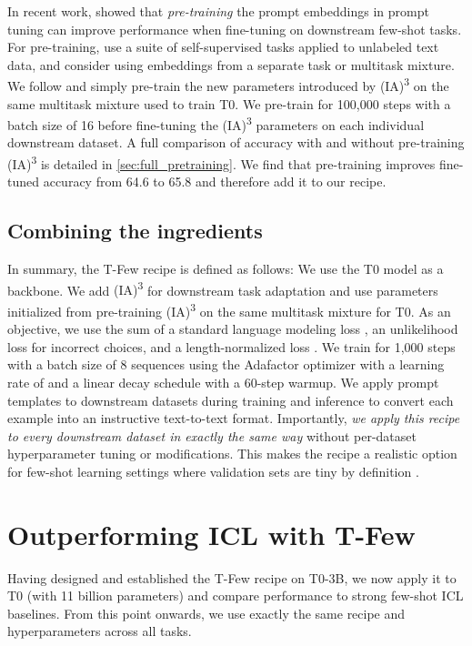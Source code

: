 \documentclass{article}
\newcommand{\ia}{{\fontfamily{lmtt}\selectfont (IA)\textsuperscript{3}}\xspace}
\newcommand{\tfew}{{\fontfamily{lmtt}\selectfont T-Few}\xspace}
\begin{document}
In recent work, \citet{gu2021ppt,vu2021spot} showed that \textit{pre-training} the prompt embeddings in prompt tuning can improve performance when fine-tuning on downstream few-shot tasks.
For pre-training, \citet{gu2021ppt} use a suite of self-supervised tasks applied to unlabeled text data, and \citet{vu2021spot} consider using embeddings from a separate task or multitask mixture.
We follow \citet{vu2021spot} and simply pre-train the new parameters introduced by \ia on the same multitask mixture used to train T0.
We pre-train for 100,000 steps with a batch size of 16 before fine-tuning the \ia parameters on each individual downstream dataset.
A full comparison of accuracy with and without pre-training \ia is detailed in \cref{sec:full_pretraining}.
We find that pre-training improves fine-tuned accuracy from 64.6 to 65.8 and therefore add it to our recipe.

\subsection{Combining the ingredients}

In summary, the \tfew recipe is defined as follows:
We use the T0 model as a backbone.
We add \ia for downstream task adaptation and use parameters initialized from pre-training \ia on the same multitask mixture for T0.
As an objective, we use the sum of a standard language modeling loss , an unlikelihood loss  for incorrect choices, and a length-normalized loss .
We train for 1,000 steps with a batch size of 8 sequences using the Adafactor optimizer \cite{shazeer2018adafactor} with a learning rate of  and a linear decay schedule with a 60-step warmup.
We apply prompt templates to downstream datasets during training and inference to convert each example into an instructive text-to-text format.
Importantly, \textit{we apply this recipe to every downstream dataset in exactly the same way} without per-dataset hyperparameter tuning or modifications.
This makes the recipe a realistic option for few-shot learning settings where validation sets are tiny by definition \cite{perez2021true,oliver2018realistic}.

\section{Outperforming ICL with \tfew}
\label{sec:experiments}

Having designed and established the \tfew recipe on T0-3B, we now apply it to T0 (with 11 billion parameters) and compare performance to strong few-shot ICL baselines.
From this point onwards, we use exactly the same recipe and hyperparameters across all tasks.
\end{document}
